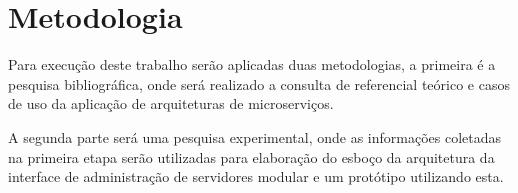 \section{Metodologia}

  Para execução deste trabalho serão aplicadas duas metodologias, a primeira
  é a pesquisa bibliográfica, onde será realizado a consulta de referencial
  teórico e casos de uso da aplicação de arquiteturas de microserviços.

  A segunda parte será uma pesquisa experimental, onde as informações coletadas
  na primeira etapa serão utilizadas para elaboração do esboço da arquitetura
  da interface de administração de servidores modular e um protótipo utilizando
  esta.

